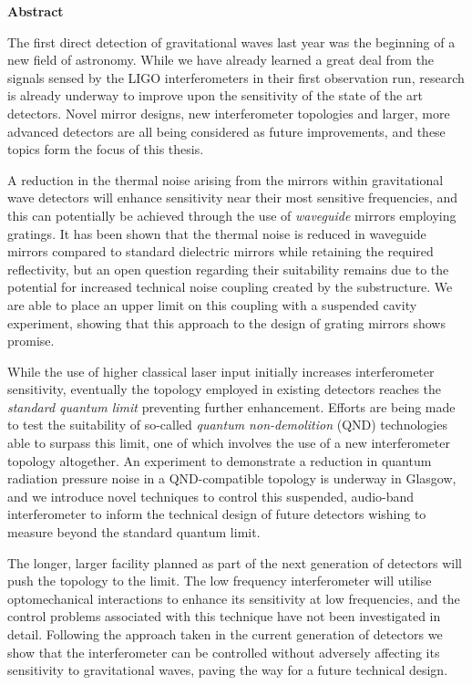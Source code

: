 \begin{preface}
\begin{center} {\bf Abstract}\end{center}

The first direct detection of gravitational waves last year was the beginning of a new field of astronomy. While we have already learned a great deal from the signals sensed by the LIGO interferometers in their first observation run, research is already underway to improve upon the sensitivity of the state of the art detectors. Novel mirror designs, new interferometer topologies and larger, more advanced detectors are all being considered as future improvements, and these topics form the focus of this thesis.

A reduction in the thermal noise arising from the mirrors within gravitational wave detectors will enhance sensitivity near their most sensitive frequencies, and this can potentially be achieved through the use of \emph{waveguide} mirrors employing gratings. It has been shown that the thermal noise is reduced in waveguide mirrors compared to standard dielectric mirrors while retaining the required reflectivity, but an open question regarding their suitability remains due to the potential for increased technical noise coupling created by the substructure. We are able to place an upper limit on this coupling with a suspended cavity experiment, showing that this approach to the design of grating mirrors shows promise.

While the use of higher classical laser input initially increases interferometer sensitivity, eventually the \MI{} topology employed in existing detectors reaches the \emph{standard quantum limit} preventing further enhancement. Efforts are being made to test the suitability of so-called \emph{quantum non-demolition} (QND) technologies able to surpass this limit, one of which involves the use of a new interferometer topology altogether. An experiment to demonstrate a reduction in quantum radiation pressure noise in a QND-compatible \SSM{} topology is underway in Glasgow, and we introduce novel techniques to control this suspended, audio-band interferometer to inform the technical design of future detectors wishing to measure beyond the standard quantum limit.

The longer, larger \ET{} facility planned as part of the next generation of detectors will push the \MI{} topology to the limit. The low frequency interferometer will utilise optomechanical interactions to enhance its sensitivity at low frequencies, and the control problems associated with this technique have not been investigated in detail. Following the approach taken in the current generation of detectors we show that the interferometer can be controlled without adversely affecting its sensitivity to gravitational waves, paving the way for a future technical design.
\end{preface}